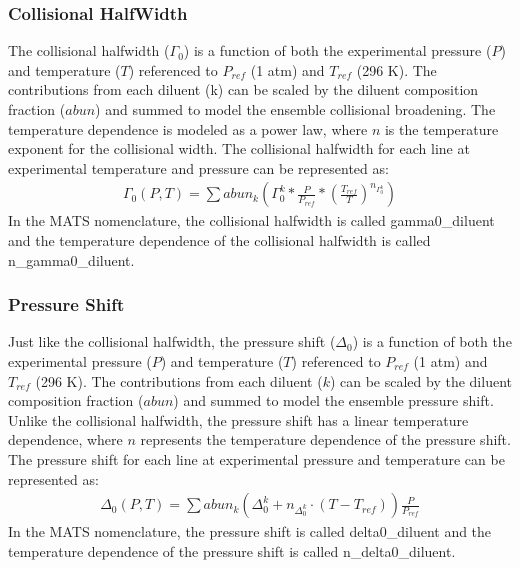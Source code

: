 \documentclass[letterpaper,10pt,english]{sphinxmanual}
\begin{document}
\subsubsection{Collisional Half\sphinxhyphen{}Width}
\label{\detokenize{MATS Summary:collisional-half-width}}
\sphinxAtStartPar
The collisional half\sphinxhyphen{}width (\(\Gamma_{0}\)) is a function of both the experimental pressure (\(P\)) and temperature (\(T\)) referenced to \(P_{ref}\) (1 atm) and \(T_{ref}\) (296 K). The contributions from each diluent (k) can be scaled by the diluent composition fraction (\(abun\)) and summed to model the ensemble collisional broadening.  The temperature dependence is modeled as a power law, where \(n\) is the temperature exponent for the collisional width.  The collisional half\sphinxhyphen{}width for each line at experimental temperature and pressure can be represented as:
\begin{equation*}
\begin{split}\Gamma_{0} (P,T) = \sum abun_{k} (\Gamma_{0}^{k} * \frac{P}{P_{ref}} * (\frac{T_{ref}}{T})^{n_{\Gamma_{0}^{k}}})\end{split}
\end{equation*}
\sphinxAtStartPar
In the MATS nomenclature, the collisional half\sphinxhyphen{}width is called gamma0\_diluent and the temperature dependence of the collisional half\sphinxhyphen{}width is called n\_gamma0\_diluent.


\subsubsection{Pressure Shift}
\label{\detokenize{MATS Summary:pressure-shift}}
\sphinxAtStartPar
Just like the collisional half\sphinxhyphen{}width, the pressure shift (\(\Delta_{0}\)) is a function of both the experimental pressure (\(P\)) and temperature (\(T\)) referenced to \(P_{ref}\) (1 atm) and \(T_{ref}\) (296 K). The contributions from each diluent (\(k\)) can be scaled by the diluent composition fraction (\(abun\)) and summed to model the ensemble pressure shift.  Unlike the collisional half\sphinxhyphen{}width, the pressure shift has a linear temperature dependence, where \(n\) represents the temperature dependence of the pressure shift.  The pressure shift for each line at experimental pressure and temperature can be represented as:
\begin{equation*}
\begin{split}\Delta_{0} (P,T) = \sum abun_{k} (\Delta_{0}^{k} +  n_{\Delta_{0}^{k}}\cdot (T - T_{ref}) )\frac{P}{P_{ref}}\end{split}
\end{equation*}
\sphinxAtStartPar
In the MATS nomenclature, the pressure shift is called delta0\_diluent and the temperature dependence of the pressure shift is called n\_delta0\_diluent.
\end{document}
